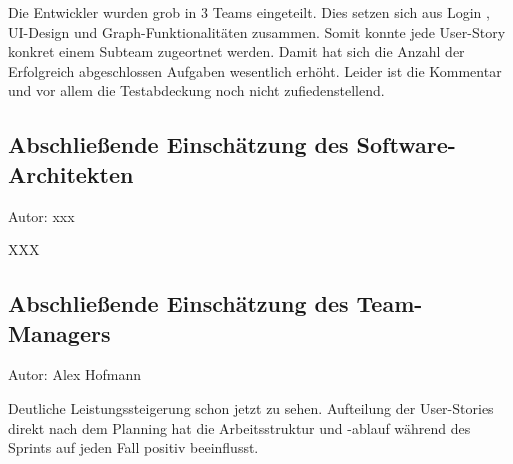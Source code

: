 Die Entwickler wurden grob in 3 Teams eingeteilt. Dies setzen sich aus Login , UI-Design und Graph-Funktionalitäten zusammen. Somit konnte jede User-Story konkret einem Subteam zugeortnet werden. Damit hat sich die Anzahl der Erfolgreich abgeschlossen Aufgaben wesentlich erhöht. Leider ist die Kommentar und vor allem die Testabdeckung noch nicht zufiedenstellend.


\subsection{Abschließende Einschätzung des Software-Architekten}
{\small Autor: xxx}

XXX

\subsection{Abschließende Einschätzung des Team-Managers}
{\small Autor: Alex Hofmann}

Deutliche Leistungssteigerung schon jetzt zu sehen. Aufteilung der User-Stories direkt nach dem Planning hat die Arbeitsstruktur und -ablauf während des Sprints auf jeden Fall positiv beeinflusst.

